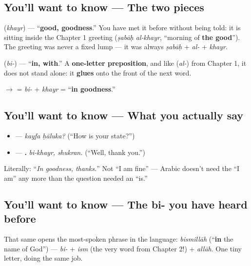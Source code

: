 \subsection*{You'll want to know — The two pieces}
\textbf{} (\emph{khayr}) — \textquotedblleft{}\textbf{good, goodness}.\textquotedblright{} You have met it before without being told: it is sitting inside the Chapter 1 greeting \textbf{ } (\emph{ṣabāḥ al-khayr}, \textquotedblleft{}morning of \textbf{the good}\textquotedblright{}). The greeting was never a fixed lump — it was always \emph{ṣabāḥ} + \emph{al-} + \emph{khayr}.

\textbf{} (\emph{bi-}) — \textquotedblleft{}\textbf{in, with}.\textquotedblright{} A \textbf{one-letter preposition}, and like \textbf{} (\emph{al-}) from Chapter 1, it does not stand alone: it \textbf{glues} onto the front of the next word.

$\to$ \textbf{} = \emph{bi-} + \emph{khayr} = \textquotedblleft{}\textbf{in goodness}.\textquotedblright{}

\subsection*{You'll want to know — What you actually say}
\begin{itemize}
\raggedright
  \item — \emph{kayfa ḥāluka?} (\textquotedblleft{}How is your state?\textquotedblright{})
  \item — \textbf{ .} \emph{bi-khayr, shukran.} (\textquotedblleft{}Well, thank you.\textquotedblright{})
\end{itemize}

Literally: \textquotedblleft{}\emph{In goodness, thanks.}\textquotedblright{} Not \textquotedblleft{}I am fine\textquotedblright{} — Arabic doesn't need the \textquotedblleft{}I am\textquotedblright{} any more than the question needed an \textquotedblleft{}is.\textquotedblright{}

\subsection*{You'll want to know — The bi- you have heard before}
That same \textbf{} opens the most-spoken phrase in the language: \emph{bismillāh} (\textquotedblleft{}\textbf{in} the name of God\textquotedblright{}) — \emph{bi-} + \emph{ism} (the very word from Chapter 2!) + \emph{allāh}. One tiny letter, doing the same job.

